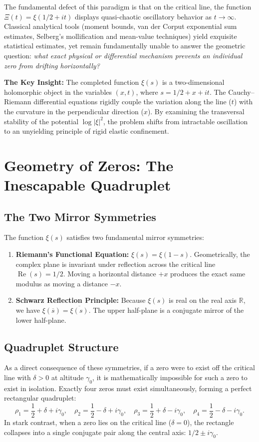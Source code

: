 \documentclass[11pt,a4paper]{article}
\theoremstyle{definition}
\theoremstyle{remark}
\begin{document}
The fundamental defect of this paradigm is that on the critical line, the function $\Xi(t) = \xi(1/2 + it)$ displays quasi-chaotic oscillatory behavior as $t \to \infty$. Classical analytical tools (moment bounds, van der Corput exponential sum estimates, Selberg's mollification and mean-value techniques) yield exquisite statistical estimates, yet remain fundamentally unable to answer the geometric question: \emph{what exact physical or differential mechanism prevents an individual zero from drifting horizontally?}

\textbf{The Key Insight:} The completed function $\xi(s)$ is a two-dimensional holomorphic object in the variables $(x, t)$, where $s = 1/2 + x + it$. The Cauchy--Riemann differential equations rigidly couple the variation along the line ($t$) with the curvature in the perpendicular direction ($x$). By examining the transversal stability of the potential $\log |\xi|^2$, the problem shifts from intractable oscillation to an unyielding principle of rigid elastic confinement.

\section{Geometry of Zeros: The Inescapable Quadruplet}

\subsection{The Two Mirror Symmetries}
The function $\xi(s)$ satisfies two fundamental mirror symmetries:
\begin{enumerate}
    \item \textbf{Riemann's Functional Equation:} $\xi(s) = \xi(1 - s)$. Geometrically, the complex plane is invariant under reflection across the critical line $\operatorname{Re}(s) = 1/2$. Moving a horizontal distance $+x$ produces the exact same modulus as moving a distance $-x$.
    \item \textbf{Schwarz Reflection Principle:} Because $\xi(s)$ is real on the real axis $\mathbb{R}$, we have $\xi(\overline{s}) = \overline{\xi(s)}$. The upper half-plane is a conjugate mirror of the lower half-plane.
\end{enumerate}

\subsection{Quadruplet Structure}
As a direct consequence of these symmetries, if a zero were to exist off the critical line with $\delta > 0$ at altitude $\gamma_0$, it is mathematically impossible for such a zero to exist in isolation. Exactly four zeros must exist simultaneously, forming a perfect rectangular quadruplet:
\begin{equation}
\rho_1 = \frac{1}{2} + \delta + i\gamma_0, \quad
\rho_2 = \frac{1}{2} - \delta + i\gamma_0, \quad
\rho_3 = \frac{1}{2} + \delta - i\gamma_0, \quad
\rho_4 = \frac{1}{2} - \delta - i\gamma_0.
\end{equation}
In stark contrast, when a zero lies on the critical line ($\delta = 0$), the rectangle collapses into a single conjugate pair along the central axis: $1/2 \pm i\gamma_0$.
\end{document}
